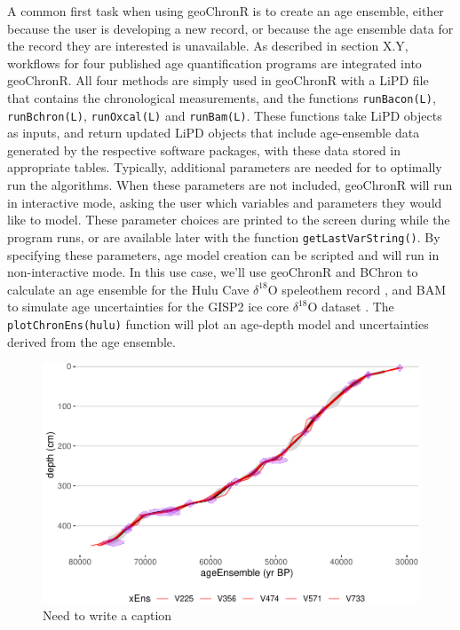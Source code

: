 \documentclass[gc, manuscript]{copernicus}
\begin{document}
A common first task when using geoChronR is to create an age ensemble,
either because the user is developing a new record, or because the age
ensemble data for the record they are interested is unavailable. As
described in section X.Y, workflows for four published age
quantification programs are integrated into geoChronR. All four methods
are simply used in geoChronR with a LiPD file that contains the
chronological measurements, and the functions \texttt{runBacon(L)},
\texttt{runBchron(L)}, \texttt{runOxcal(L)} and \texttt{runBam(L)}.
These functions take LiPD objects as inputs, and return updated LiPD
objects that include age-ensemble data generated by the respective
software packages, with these data stored in appropriate tables.
Typically, additional parameters are needed for to optimally run the
algorithms. When these parameters are not included, geoChronR will run
in interactive mode, asking the user which variables and parameters they
would like to model. These parameter choices are printed to the screen
during while the program runs, or are available later with the function
\texttt{getLastVarString()}. By specifying these parameters, age model
creation can be scripted and will run in non-interactive mode. In this
use case, we'll use geoChronR and BChron \citep{parnell2008flexible} to
calculate an age ensemble for the Hulu Cave \(\delta^{18}\)O speleothem
record \citep{hulu2001}, and BAM \citep{BAM} to simulate age
uncertainties for the GISP2 ice core \(\delta^{18}\)O dataset
\citep{alley}. The \texttt{plotChronEns(hulu)} function will plot an
age-depth model and uncertainties derived from the age ensemble.

\begin{figure}
\centering
\includegraphics{geoChronR-paper_files/figure-latex/unnamed-chunk-4-1.pdf}
\caption{\label{fig:unnamed-chunk-4}Need to write a caption}
\end{figure}
\end{document}
